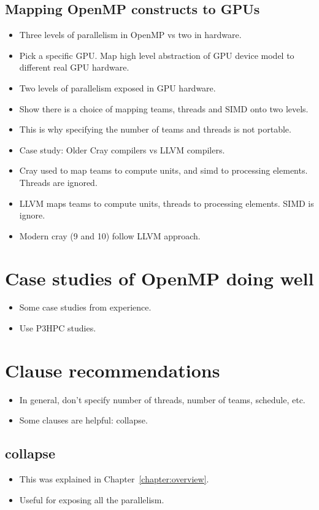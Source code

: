 \subsection{Mapping OpenMP constructs to GPUs}
\begin{itemize}
  \item Three levels of parallelism in OpenMP vs two in hardware.
  \item Pick a specific GPU. Map high level abstraction of GPU device model to different real GPU hardware.
  \item Two levels of parallelism exposed in GPU hardware.
  \item Show there is a choice of mapping teams, threads and SIMD onto two levels.
  \item This is why specifying the number of teams and threads is not portable.
  \item Case study: Older Cray compilers vs LLVM compilers.
  \item Cray used to map teams to compute units, and simd to processing elements. Threads are ignored.
  \item LLVM maps teams to compute units, threads to processing elements. SIMD is ignore.
  \item Modern cray (9 and 10) follow LLVM approach.
\end{itemize}

\section{Case studies of OpenMP doing well}
\begin{itemize}
  \item Some case studies from experience.
  \item Use P3HPC studies.
\end{itemize}

\section{Clause recommendations}
\begin{itemize}
  \item In general, don't specify number of threads, number of teams, schedule, etc.
  \item Some clauses are helpful: collapse.
\end{itemize}

\subsection{collapse}
\begin{itemize}
  \item This was explained in Chapter~\ref{chapter:overview}.
  \item Useful for exposing all the parallelism.
\end{itemize}




